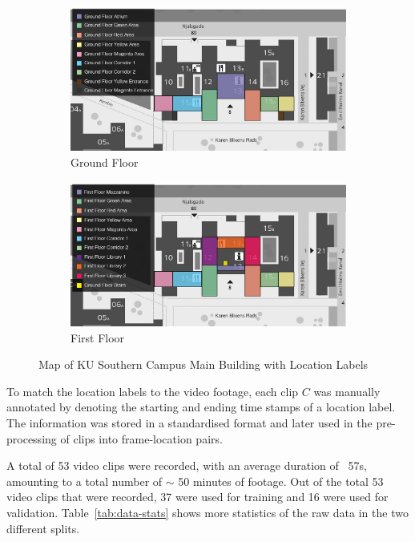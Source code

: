 \documentclass[a4paper]{article}
\begin{document}
  \begin{figure}[ht]
    \centering
    \begin{subfigure}[b]{0.49\linewidth}
      \centering
      \includegraphics[width=\linewidth]{figures/map-ground-floor.jpg}
      \caption{Ground Floor}
      \label{fig:map-ground-floor}
    \end{subfigure}
    \hfill
    \begin{subfigure}[b]{0.49\linewidth}
      \centering
      \includegraphics[width=\linewidth]{figures/map-first-floor.jpg}
      \caption{First Floor}
      \label{fig:map-first-floor}
    \end{subfigure}
    \caption{Map of KU Southern Campus Main Building with Location Labels}
    \label{fig:map}
  \end{figure}

  To match the location labels to the video footage, each clip $C$ was manually
  annotated by denoting the starting and ending time stamps of a location label.
  The information was stored in a standardised format and later used in the
  pre-processing of clips into frame-location pairs.

  A total of 53 video clips were recorded, with an average duration of ~57s,
  amounting to a total number of $\sim$ 50 minutes of footage. Out of the total
  53 video clips that were recorded, 37 were used for training and 16 were used
  for validation. Table~\ref{tab:data-stats} shows more statistics of the raw
  data in the two different splits.
\end{document}
